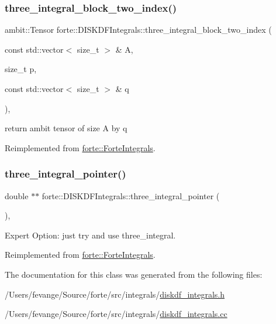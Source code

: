 \subsubsection{\texorpdfstring{three\+\_\+integral\+\_\+block\+\_\+two\+\_\+index()}{three\_integral\_block\_two\_index()}}
{\footnotesize\ttfamily ambit\+::\+Tensor forte\+::\+D\+I\+S\+K\+D\+F\+Integrals\+::three\+\_\+integral\+\_\+block\+\_\+two\+\_\+index (\begin{DoxyParamCaption}\item[{const std\+::vector$<$ size\+\_\+t $>$ \&}]{A,  }\item[{size\+\_\+t}]{p,  }\item[{const std\+::vector$<$ size\+\_\+t $>$ \&}]{q }\end{DoxyParamCaption})\hspace{0.3cm}{\ttfamily [override]}, {\ttfamily [virtual]}}



return ambit tensor of size A by q 



Reimplemented from \mbox{\hyperlink{classforte_1_1_forte_integrals_aab51824020dc3588c026b5b7740f55a9}{forte\+::\+Forte\+Integrals}}.

\mbox{\label{classforte_1_1_d_i_s_k_d_f_integrals_a43f80b9c9e3b67223a11049c3e2f52e2}} 
\subsubsection{\texorpdfstring{three\+\_\+integral\+\_\+pointer()}{three\_integral\_pointer()}}
{\footnotesize\ttfamily double $\ast$$\ast$ forte\+::\+D\+I\+S\+K\+D\+F\+Integrals\+::three\+\_\+integral\+\_\+pointer (\begin{DoxyParamCaption}{ }\end{DoxyParamCaption})\hspace{0.3cm}{\ttfamily [override]}, {\ttfamily [virtual]}}



Expert Option\+: just try and use three\+\_\+integral. 



Reimplemented from \mbox{\hyperlink{classforte_1_1_forte_integrals_a69292bc8e42a76e344cd01c4e3dd48d5}{forte\+::\+Forte\+Integrals}}.



The documentation for this class was generated from the following files\+:\begin{DoxyCompactItemize}
\item 
/\+Users/fevange/\+Source/forte/src/integrals/\mbox{\hyperlink{diskdf__integrals_8h}{diskdf\+\_\+integrals.\+h}}\item 
/\+Users/fevange/\+Source/forte/src/integrals/\mbox{\hyperlink{diskdf__integrals_8cc}{diskdf\+\_\+integrals.\+cc}}\end{DoxyCompactItemize}
